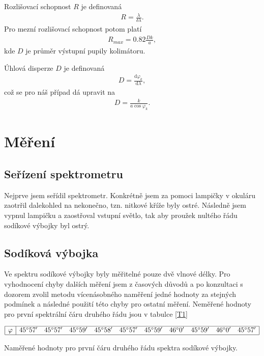 \documentclass[a4paper,12pt]{article}
\begin{document}
Rozlišovací schopnost $R$ je definovaná
\begin{eqnarray}
R=\frac{\lambda}{\delta\lambda}.
\end{eqnarray}
Pro mezní rozlišovací schopnost potom platí
\begin{eqnarray}
R_{max}=0.82\frac{Dk}{a},
\label{R}
\end{eqnarray}
kde $D$ je průměr výstupní pupily kolimátoru.

Úhlová disperze $D$ je definovaná
\begin{eqnarray}
D=\frac{\mbox{d}\varphi_k}{\mbox{d}\lambda},
\end{eqnarray}
což se pro náš případ dá upravit na
\begin{eqnarray}
D=\frac{k}{a\cos\varphi_k}.
\label{D}
\end{eqnarray}

\section{Měření}
\subsection{Seřízení spektrometru}
Nejprve jsem seřídil spektrometr. Konkrétně jsem za pomoci lampičky v okuláru zaotrřil dalekohled na nekonečno, 
tzn. nitkové kříže byly ostré. Následně jsem vypnul lampičku a zaostřoval vstupní světlo, tak aby proužek nultého řádu 
sodíkové výbojky byl ostrý.

\subsection{Sodíková výbojka}
Ve spektru sodíkové výbojky byly měřitelné pouze dvě vlnové délky. Pro vyhodnocení chyby dalších měření jsem z časových 
důvodů a po konzultaci s dozorem zvolil metodu vícenásobného naměření jedné hodnoty za stejných podmínek a následné 
použití této chyby pro ostatní měření. Neměřené hodnoty pro první spektrální čáru druhého řádu jsou v tabulce \ref{T1}

\begin{table}
$$
\begin{array}{|c|cccccccccc|}
\hline
\varphi&    45^{\circ} 57'&  45^{\circ} 57'&  45^{\circ} 59'& 45^{\circ} 58'&   45^{\circ} 57'& 45^{\circ} 59'& 46^{\circ} 0'& 45^{\circ} 59'& 46^{\circ} 0' & 45^{\circ} 57' \\ \hline
\end{array}
$$
\caption{Naměřené hodnoty pro první čáru druhého řádu spektra sodíkové výbojky.}
\label{T1}
\end{table}
\end{document}
